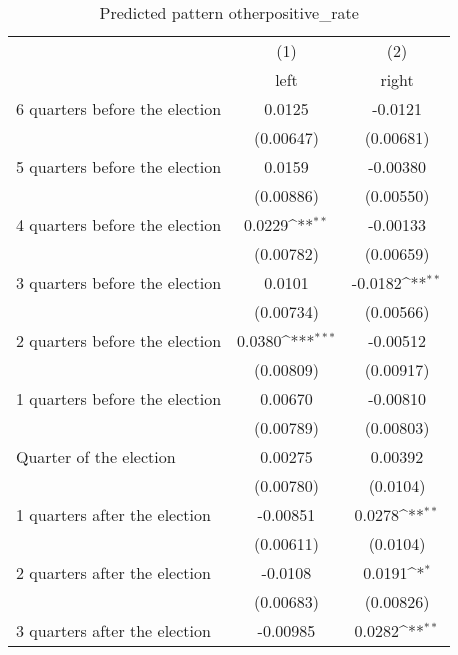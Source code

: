 \begin{table}[htbp]\centering
\def\sym#1{\ifmmode^{#1}\else\(^{#1}\)\fi}
\caption{Predicted pattern otherpositive\_rate}
\begin{tabular}{l*{2}{c}}
\hline\hline
                    &\multicolumn{1}{c}{(1)}&\multicolumn{1}{c}{(2)}\\
                    &\multicolumn{1}{c}{left}&\multicolumn{1}{c}{right}\\
\hline
 6 quarters before the election&      0.0125         &     -0.0121         \\
                    &   (0.00647)         &   (0.00681)         \\
[1em]
 5 quarters before the election&      0.0159         &    -0.00380         \\
                    &   (0.00886)         &   (0.00550)         \\
[1em]
 4 quarters before the election&      0.0229\sym{**} &    -0.00133         \\
                    &   (0.00782)         &   (0.00659)         \\
[1em]
 3 quarters before the election&      0.0101         &     -0.0182\sym{**} \\
                    &   (0.00734)         &   (0.00566)         \\
[1em]
 2 quarters before the election&      0.0380\sym{***}&    -0.00512         \\
                    &   (0.00809)         &   (0.00917)         \\
[1em]
 1 quarters before the election&     0.00670         &    -0.00810         \\
                    &   (0.00789)         &   (0.00803)         \\
[1em]
Quarter of the election&     0.00275         &     0.00392         \\
                    &   (0.00780)         &    (0.0104)         \\
[1em]
 1 quarters after the election&    -0.00851         &      0.0278\sym{**} \\
                    &   (0.00611)         &    (0.0104)         \\
[1em]
 2 quarters after the election&     -0.0108         &      0.0191\sym{*}  \\
                    &   (0.00683)         &   (0.00826)         \\
[1em]
 3 quarters after the election&    -0.00985         &      0.0282\sym{**} \\

\end{tabular}
\end{table}

